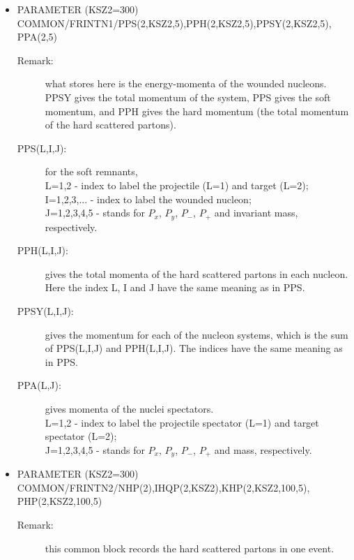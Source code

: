 \begin{itemize}
\begin{description}
\end{description}


\item{PARAMETER (KSZ2=300) \\
      COMMON/FRINTN1/PPS(2,KSZ2,5),PPH(2,KSZ2,5),PPSY(2,KSZ2,5),\\
                     PPA(2,5)}
\begin{description}
\item[Remark: ] what stores here is the energy-momenta of the wounded
         nucleons.  PPSY gives the total momentum of the system, PPS
         gives the soft momentum, and PPH gives the hard momentum 
         (the total momentum of the hard scattered partons).  
\item[PPS(L,I,J):] for the soft remnants, \\ 
      L=1,2 - index to label the projectile (L=1) and target (L=2);\\
      I=1,2,3,... - index to label the wounded nucleon;\\
      J=1,2,3,4,5 - stands for $P_x$, $P_y$, $P_-$, $P_+$ and invariant mass,
                    respectively.
\item[PPH(L,I,J):]  gives the total momenta of the hard scattered partons
      in each nucleon.  Here the index L, I and J have the same meaning
      as in PPS.
\item[PPSY(L,I,J):]  gives the momentum for each of the nucleon systems,
      which is the sum of PPS(L,I,J) and PPH(L,I,J).  The indices have
      the same meaning as in PPS.  
\item[PPA(L,J):] gives momenta of the nuclei spectators.  \\      
      L=1,2 - index to label the projectile spectator (L=1) and target 
              spectator (L=2); \\
      J=1,2,3,4,5 - stands for $P_x$, $P_y$, $P_-$, $P_+$ and mass, respectively.
\end{description}


\item{PARAMETER (KSZ2=300) \\
      COMMON/FRINTN2/NHP(2),IHQP(2,KSZ2),KHP(2,KSZ2,100,5),\\
                     PHP(2,KSZ2,100,5)}
\begin{description}
\item[Remark: ] this common block records the hard scattered partons in one
                event.


\end{description}
\end{itemize}

